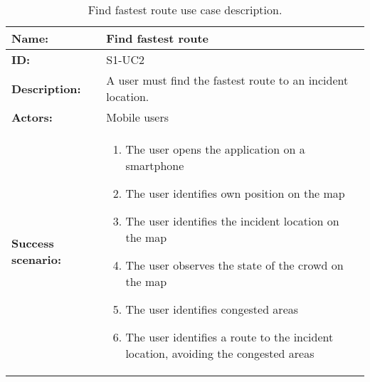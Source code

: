 \begin{table}[htbp]
    \centering
    \begin{tabularx}{\textwidth}{l X}
        \toprule
        \textbf{Name:}  & Find fastest route \\ \midrule
        \textbf{ID:}    & S1-UC2\\ \midrule
        \textbf{Description:} & A user must find the fastest route to an incident location. \\ \midrule
        \textbf{Actors:} & Mobile users \\ \midrule
        \textbf{Success scenario:} & 
        \begin{enumerate}
            \item The user opens the application on a smartphone
            \item The user identifies own position on the map
            \item The user identifies the incident location on the map
            \item The user observes the state of the crowd on the map
            \item The user identifies congested areas
            \item The user identifies a route to the incident location, avoiding the congested areas
        \end{enumerate}
        \\
        \bottomrule
    \end{tabularx}
    \caption{Find fastest route use case description.}
    \label{tab:s1-uc2}
\end{table}